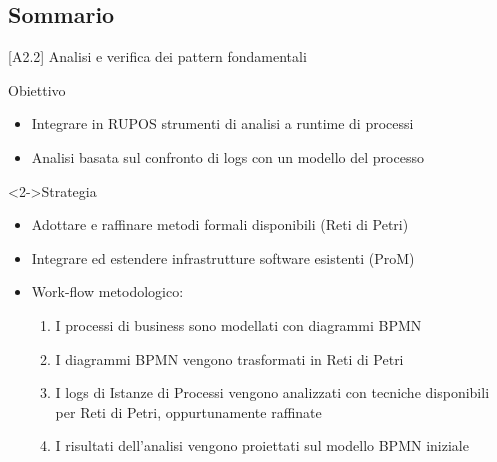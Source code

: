 \documentclass[10pt]{beamer}
\begin{document}
	\subsection{Sommario}
	\begin{frame}{[A2.2] Analisi e verifica dei pattern fondamentali}
	  \begin{block}{Obiettivo}
	\begin{itemize}
	  \item Integrare in RUPOS strumenti di analisi a runtime di processi
	  \item  Analisi basata sul confronto di logs con un modello del processo
	\end{itemize}
	\end{block}
	
	  \begin{block}<2->{Strategia}
	    \begin{itemize}
	    \item Adottare e raffinare  metodi formali disponibili (Reti di Petri)
	    \item Integrare ed estendere infrastrutture software esistenti (ProM)
	    \item Work-flow metodologico:
	      \begin{enumerate}
	      \item I processi di business sono modellati con diagrammi BPMN
	      \item I diagrammi BPMN vengono trasformati in Reti di Petri
	      \item I logs di Istanze di Processi vengono analizzati con tecniche disponibili per Reti di Petri, oppurtunamente raffinate
	      \item I risultati dell'analisi vengono proiettati sul modello BPMN iniziale
	      \end{enumerate}
	    \end{itemize}
	
	  \end{block}
	\end{frame}
	
	
	
\end{document}
